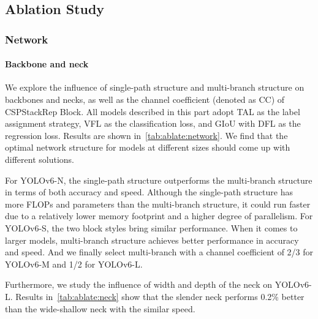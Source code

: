 \documentclass[10pt,twocolumn,letterpaper]{article}
\begin{document}
\subsection{Ablation Study}
\subsubsection{Network}
\paragraph{Backbone and neck}
  We explore the influence of single-path structure and multi-branch structure on backbones and necks, as well as the channel coefficient (denoted as CC) of CSPStackRep Block. All models described in this part adopt TAL as the label assignment strategy, VFL as the classification loss, and GIoU with DFL as the regression loss. Results are shown in~\cref{tab:ablate:network}. We find that the optimal network structure for models at different sizes should come up with different solutions. 

  For YOLOv6-N, the single-path structure outperforms the multi-branch structure in terms of both accuracy and speed. Although the single-path structure has more FLOPs and parameters than the multi-branch structure, it could run faster due to a relatively lower memory footprint and a higher degree of parallelism. For YOLOv6-S, the two block styles bring similar performance. When it comes to larger models, multi-branch structure achieves better performance in accuracy and speed. And we finally select multi-branch with a channel coefficient of 2/3 for YOLOv6-M and 1/2 for YOLOv6-L. 

  Furthermore, we study the influence of width and depth of the neck on YOLOv6-L. Results in~\cref{tab:ablate:neck} show that the slender neck performs 0.2\% better than the wide-shallow neck with the similar speed.
\end{document}
